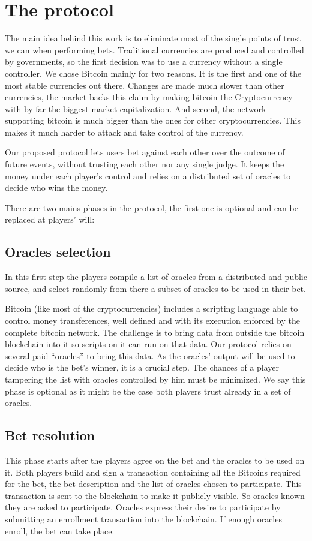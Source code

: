 \section{The protocol}

The main idea behind this work is to eliminate most of the single points of
  trust we can when performing bets.
Traditional currencies are produced and controlled by governments, so the first
  decision was to use a currency without a single controller.
We chose Bitcoin mainly for two reasons.
It is the first and one of the most stable currencies out there.
Changes are made much slower than other currencies, the market backs this claim
  by making bitcoin the Cryptocurrency with by far the biggest market
  capitalization.
And second, the network supporting bitcoin is much bigger than the ones for
  other cryptocurrencies. This makes it much harder to attack and take control
  of the currency.

Our proposed protocol lets users bet against each other over the outcome of
  future events, without trusting each other nor any single judge.
It keeps the money under each player's control and relies on a distributed set
  of oracles to decide who wins the money.

There are two mains phases in the protocol, the first one is optional and
  can be replaced at players' will:

\subsection{Oracles selection}
In this first step the players compile a list of oracles from a distributed
  and public source, and select randomly from there a subset of oracles to
  be used in their bet.

Bitcoin (like most of the cryptocurrencies) includes a scripting language able
 to control money transferences, well defined and with its execution enforced by
 the complete bitcoin network.
The challenge is to bring data from outside the bitcoin blockchain into it so
  scripts on it can run on that data.
Our protocol relies on several paid ``oracles'' to bring this data.
As the oracles' output will be used to decide who is the bet's winner, it is a
  crucial step.
The chances of a player tampering the list with oracles controlled by him must
  be minimized.
We say this phase is optional as it might be the case both players trust already
  in a set of oracles.

\subsection{Bet resolution}
This phase starts after the players agree on the bet and the oracles to be used
  on it.
Both players build and sign a transaction containing all the Bitcoins required
  for the bet, the bet description and the list of oracles chosen to
  participate.
This transaction is sent to the blockchain to make it publicly visible. So
  oracles known they are asked to participate.
Oracles express their desire to participate by submitting an enrollment
  transaction into the blockchain.
If enough oracles enroll, the bet can take place.

